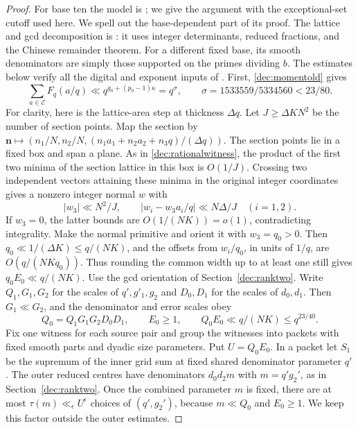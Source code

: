 \documentclass[11pt,a4paper]{article}
\theoremstyle{paperplain}
\numberwithin{equation}{section}
\begin{document}
\begin{proof}
For base ten the model is \cite[Proposition~13.3]{Maynard2019}; we give the argument with the exceptional-set cutoff used here.
We spell out the base-dependent part of its proof.
The lattice and gcd decomposition is
\cite[Lemmas 14.1--14.3]{Maynard2019}: it uses integer determinants,
reduced fractions, and the Chinese remainder theorem.
For a different fixed base, its smooth denominators are simply those
supported on the primes dividing $b$.
The estimates below verify all the digital and exponent inputs of
\cite[Lemma 14.4]{Maynard2019}. First, \eqref{dec:momentold} gives
\[
 \sum_{a\in\mathcal E}F_q(a/q)
 \ll q^{g_0+(p_0-1)\kappa}=q^\sigma,\qquad
 \sigma=1533559/5334560<23/80.
\]
For clarity, here is the lattice-area step at thickness $\Delta q$.
Let $J\ge\Delta KN^2$ be the number of section points. Map the section
by $\mathbf n\mapsto(n_1/N,n_2/N,(n_1a_1+n_2a_2+n_3q)/(\Delta q))$.
The section points lie in a fixed box and span a plane. As in
\eqref{dec:rationalwitness}, the product of the first two minima of
the section lattice in this box is $O(1/J)$. Crossing two independent
vectors attaining these minima in the original integer coordinates gives
a nonzero integer normal $w$ with
\[
 |w_3|\ll N^2/J,\qquad |w_i-w_3a_i/q|\ll N\Delta/J\quad(i=1,2).
\]
If $w_3=0$, the latter bounds are $O(1/(NK))=o(1)$, contradicting
integrality. Make the normal primitive and orient it with $w_3=q_0>0$.
Then $q_0\ll 1/(\Delta K)\le q/(NK)$, and the offsets from $w_i/q_0$,
in units of $1/q$, are $O(q/(NKq_0))$. Thus rounding the common width
up to at least one still gives $q_0 E_0\ll q/(NK)$.
Use the gcd orientation of Section~\ref{dec:ranktwo}. Write
$Q_1,G_1,G_2$ for the scales of $q',g'_1,g_2$ and $D_0,D_1$ for
the scales of $d_0,d_1$. Then $G_1\ll G_2$, and the denominator
and error scales obey
\[
 Q_0=Q_1G_1G_2D_0D_1,\qquad E_0\ge1,\qquad
 Q_0E_0\ll q/(NK)\le q^{23/40}.
\]
Fix one witness for each source pair and group the witnesses into
packets with fixed smooth parts and dyadic size parameters. Put
$U=Q_0E_0$. In a packet let $S_1$ be the supremum of the inner grid
sum at fixed shared denominator parameter $q'$. The outer reduced
centres have denominators $d_0d_2m$ with $m=q'g_2'$, as in
Section~\ref{dec:ranktwo}. Once the combined parameter $m$ is fixed,
there are at most $\tau(m)\ll_\epsilon U^\epsilon$ choices of
$(q',g_2')$, because $m\ll Q_0$ and $E_0\ge1$. We keep this
factor outside the outer estimates.


\end{proof}
\end{document}
